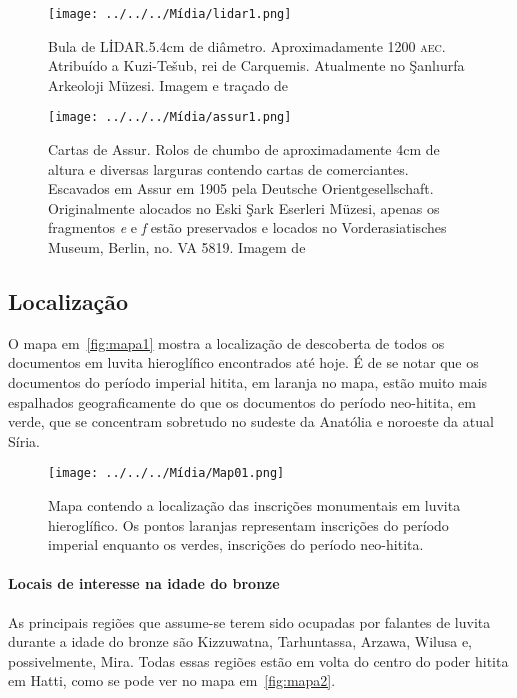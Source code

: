 \begin{figure}[htb]
	\begin{center}
		\texttt{[image: ../../../Mídia/lidar1.png]}
	\end{center}
	\caption{Bula de LİDAR.\@ 5.4cm de diâmetro. Aproximadamente 1200 \textsc{aec}.
		Atribuído a Kuzi-Tešub, rei de Carquemis.
		Atualmente no Şanlıurfa Arkeoloji Müzesi.
		Imagem e traçado de~\citet[\emph{plate} 328]{CHLI13}}\label{fig:lidar1}
	\begin{center}
		\texttt{[image: ../../../Mídia/assur1.png]}
	\end{center}
	\caption{Cartas de Assur. Rolos de chumbo de aproximadamente 4cm de altura e
		diversas larguras contendo cartas de comerciantes.
		Escavados em Assur em 1905 pela Deutsche Orientgesellschaft.
		Originalmente alocados no Eski Şark Eserleri Müzesi, apenas os
		fragmentos \emph{e} e \emph{f} estão preservados e locados no
		Vorderasiatisches Museum, Berlin, no. VA 5819.
		Imagem de~\citet[\emph{plate} 306]{CHLI13}
	}\label{fig:assur1}
\end{figure}

\clearpage

\subsection{Localização}

O mapa em~\autoref{fig:mapa1} mostra a localização de descoberta de todos os
documentos em luvita hieroglífico encontrados até hoje.
É de se notar que os documentos do período imperial hitita, em laranja no
mapa, estão muito mais espalhados geograficamente do que os documentos do
período neo-hitita, em verde, que se concentram sobretudo no sudeste da Anatólia
e noroeste da atual Síria.

\begin{figure}[ht!]
	\begin{center}
		\texttt{[image: ../../../Mídia/Map01.png]}
	\end{center}
	\caption{Mapa contendo a localização das inscrições monumentais em luvita
		hieroglífico. Os pontos laranjas representam inscrições do período imperial
		enquanto os verdes, inscrições do período neo-hitita.}\label{fig:mapa1}
\end{figure}

\paragraph{Locais de interesse na idade do bronze}
As principais regiões que assume-se terem sido ocupadas por falantes de luvita
durante a idade do bronze são Kizzuwatna, Tarhuntassa, Arzawa, Wilusa e,
possivelmente, Mira.
Todas essas regiões estão em volta do centro do poder hitita em Hatti, como se
pode ver no mapa em~\autoref{fig:mapa2}.

